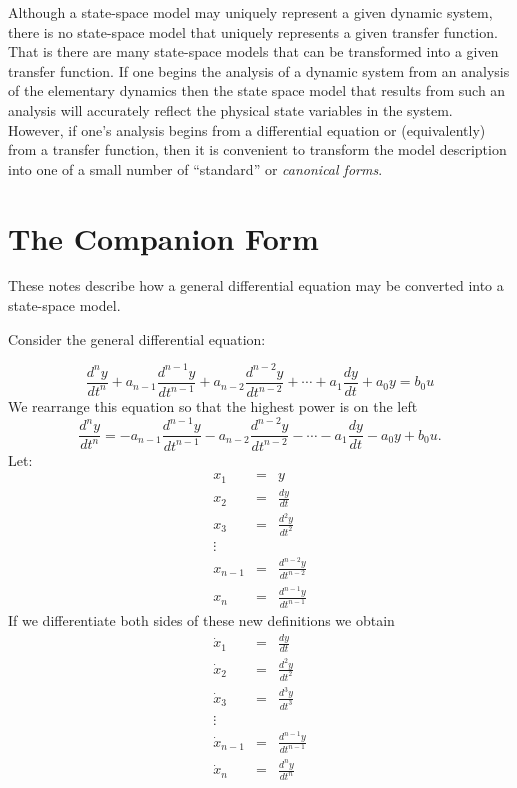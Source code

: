 \def\FileDate{98/10/14}
\def\FileVersion{1.0}

Although a state-space model may uniquely represent a given
dynamic system, there is no state-space model that uniquely
represents a given transfer function. That is there are many
state-space models that can be transformed into a given transfer
function. If one begins the analysis of a dynamic system from an
analysis of the elementary dynamics then the state space model
that results from such an analysis will accurately reflect the
physical state variables in the system. However, if one's analysis
begins from a differential equation or (equivalently) from a
transfer function, then it is convenient to transform the model
description into one of a small number of ``standard'' or
\emph{canonical forms}.

\section*{The Companion Form}
These notes describe how a general differential equation may be
converted into a state-space model.

Consider the general differential equation:

\[
\frac{d^{n}y}{dt^{n}} +
a_{n-1}\frac{d^{n-1}y}{dt^{n-1}}+a_{n-2}\frac{d^{n-2}y}{dt^{n-2}}+\cdots+a_1\frac{dy}{dt}+a_0
y = b_0 u
\]
We rearrange this equation so that the highest power is on the
left
\[
\frac{d^{n}y}{dt^{n}} =
-a_{n-1}\frac{d^{n-1}y}{dt^{n-1}}-a_{n-2}\frac{d^{n-2}y}{dt^{n-2}}-\cdots-a_1\frac{dy}{dt}-a_0
y + b_0 u.
\]
Let:
\begin{eqnarray*}
x_1 &=& y \\ x_2 &=& \frac{dy}{dt} \\ x_3 & = & \frac{d^2y}{dt^2}
\\ \vdots \\ x_{n-1} &=& \frac{d^{n-2}y}{dt^{n-2}} \\ x_{n} &=& \frac{d^{n-1}y}{dt^{n-1}}
\end{eqnarray*}
If we differentiate both sides of these new definitions we obtain
\begin{eqnarray*}
\dot{x}_1 &=& \frac{dy}{dt} \\ \dot{x}_2 &=& \frac{d^2y}{dt^2} \\
\dot{x}_3 & = & \frac{d^3y}{dt^3}
\\ \vdots \\ \dot{x}_{n-1}  &=& \frac{d^{n-1}y}{dt^{n-1}} \\ \dot{x}_{n} &=& \frac{d^{n}y}{dt^{n}}
\end{eqnarray*}

